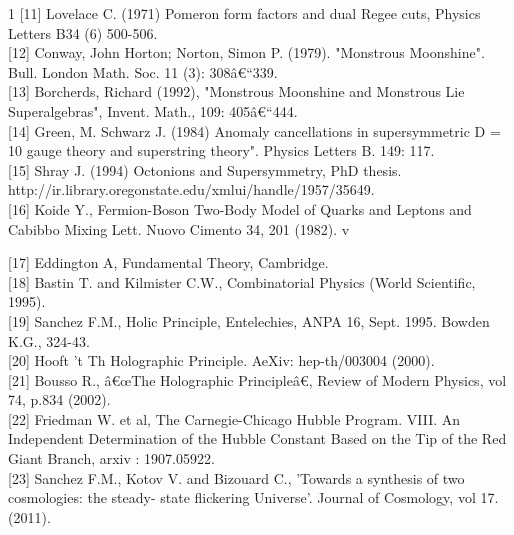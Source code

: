 \documentclass[a4paper,9pt]{article}
\begin{document}
\begin{thebibliography}{1}
 [11]  Lovelace C. (1971) Pomeron form factors and dual Regee cuts, Physics Letters B34 (6) 500-506.\\

[12]  Conway, John Horton; Norton, Simon P. (1979). "Monstrous Moonshine". Bull. London Math. Soc. 11 (3): 308â€“339.\\

[13]  Borcherds, Richard (1992), "Monstrous Moonshine and Monstrous Lie Superalgebras", Invent. Math., 109: 405â€“444.\\ 

[14]  Green, M. Schwarz J. (1984)  Anomaly cancellations in supersymmetric D = 10 gauge theory and superstring theory". Physics Letters B. 149: 117.\\



 [15] Shray J. (1994) Octonions and Supersymmetry, PhD thesis.  http://ir.library.oregonstate.edu/xmlui/handle/1957/35649. \\

[16]  Koide Y., Fermion-Boson Two-Body Model of Quarks and Leptons and Cabibbo Mixing  Lett. Nuovo Cimento 34, 201 (1982). v 

[17]  Eddington A, Fundamental Theory, Cambridge.\\

[18] Bastin T. and Kilmister C.W., Combinatorial Physics (World Scientific, 1995).\\

[19]   Sanchez F.M., Holic Principle, Entelechies, ANPA 16, Sept. 1995. Bowden K.G., 324-43.\\

[20]   Hooft 't Th Holographic Principle. AeXiv: hep-th/003004 (2000). \\

[21] Bousso R., â€œThe Holographic Principleâ€, Review of Modern Physics, vol 74, p.834 (2002).\\

[22] Friedman W. et al, The Carnegie-Chicago Hubble Program. VIII. An Independent Determination of the Hubble Constant Based on the Tip of the Red Giant Branch, arxiv : 1907.05922.\\ 

[23]  Sanchez F.M., Kotov V. and Bizouard C., 'Towards a synthesis of two cosmologies: the steady- state flickering Universe'. Journal of Cosmology, vol 17. (2011).\\


\end{thebibliography}
\end{document}
